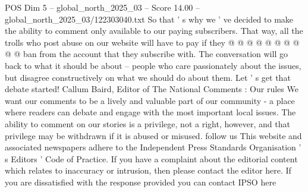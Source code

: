 \begin{textsample}{POS Dim 5 – global\_north\_2025\_03 – Score 14.00 – global\_north\_2025\_03/122303040.txt}
So that ' s why we ' ve decided to make the ability to comment only available to our paying subscribers.
That way, all the trolls who post abuse on our website will have to pay if they @ @ @ @ @ @ @ @ @ @ ban from the account that they subscribe with.
The conversation will go back to what it should be about -- people who care passionately about the issues, but disagree constructively on what we should do about them.
Let ' s get that debate started!
Callum Baird, Editor of The National Comments : Our rules We want our comments to be a lively and valuable part of our community - a place where readers can debate and engage with the most important local issues.
The ability to comment on our stories is a privilege, not a right, however, and that privilege may be withdrawn if it is abused or misused. follow us This website and associated newspapers adhere to the Independent Press Standards Organisation ' s Editors ' Code of Practice.
If you have a complaint about the editorial content which relates to inaccuracy or intrusion, then please contact the editor here.
If you are dissatisfied with the response provided you can contact IPSO here

\end{textsample}
